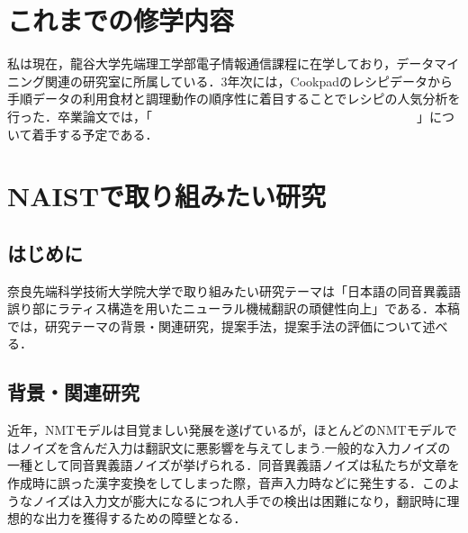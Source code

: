 \documentclass[a4j,10.5pt, twocolumn]{jarticle}
\begin{document}


\section{これまでの修学内容}
私は現在，龍谷大学先端理工学部電子情報通信課程に在学しており，データマイニング関連の研究室に所属している．3年次には，Cookpadのレシピデータから手順データの利用食材と調理動作の順序性に着目することでレシピの人気分析を行った．卒業論文では，「　　　　　　　　　　　　　　　　　　　　　」について着手する予定である．
\section{NAISTで取り組みたい研究}
\subsection{はじめに}
奈良先端科学技術大学院大学で取り組みたい研究テーマは「日本語の同音異義語誤り部にラティス構造を用いたニューラル機械翻訳の頑健性向上」である．本稿では，研究テーマの背景・関連研究，提案手法，提案手法の評価について述べる．

\subsection{背景・関連研究}
近年，NMTモデルは目覚ましい発展を遂げているが，ほとんどのNMTモデルではノイズを含んだ入力は翻訳文に悪影響を与えてしまう\cite{Belinkov}.一般的な入力ノイズの一種として同音異義語ノイズが挙げられる．同音異義語ノイズは私たちが文章を作成時に誤った漢字変換をしてしまった際，音声入力時などに発生する．このようなノイズは入力文が膨大になるにつれ人手での検出は困難になり，翻訳時に理想的な出力を獲得するための障壁となる．
\end{document}
